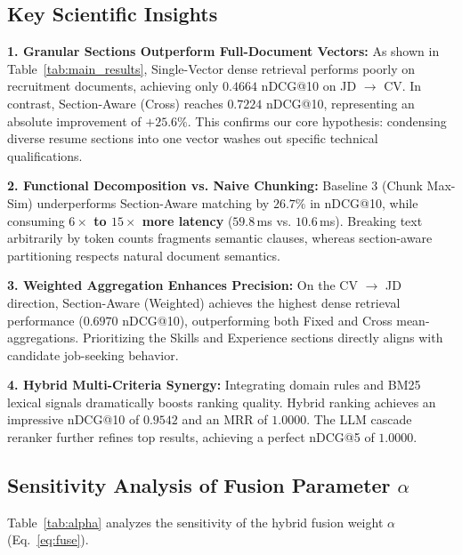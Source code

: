 \documentclass[runningheads]{llncs}
\begin{document}
\subsection{Key Scientific Insights}

\textbf{1. Granular Sections Outperform Full-Document Vectors:}
As shown in Table~\ref{tab:main_results}, Single-Vector dense retrieval performs poorly on recruitment documents, achieving only $0.4664$ nDCG@10 on JD $\rightarrow$ CV. In contrast, Section-Aware (Cross) reaches $0.7224$ nDCG@10, representing an absolute improvement of \textbf{$+25.6\%$}. This confirms our core hypothesis: condensing diverse resume sections into one vector washes out specific technical qualifications.

\textbf{2. Functional Decomposition vs. Naive Chunking:}
Baseline 3 (Chunk Max-Sim) underperforms Section-Aware matching by $26.7\%$ in nDCG@10, while consuming \textbf{$6\times$ to $15\times$ more latency} ($59.8$\,ms vs. $10.6$\,ms). Breaking text arbitrarily by token counts fragments semantic clauses, whereas section-aware partitioning respects natural document semantics.

\textbf{3. Weighted Aggregation Enhances Precision:}
On the CV $\rightarrow$ JD direction, Section-Aware (Weighted) achieves the highest dense retrieval performance ($0.6970$ nDCG@10), outperforming both Fixed and Cross mean-aggregations. Prioritizing the Skills and Experience sections directly aligns with candidate job-seeking behavior.

\textbf{4. Hybrid Multi-Criteria Synergy:}
Integrating domain rules and BM25 lexical signals dramatically boosts ranking quality. Hybrid ranking achieves an impressive nDCG@10 of \textbf{$0.9542$} and an MRR of \textbf{$1.0000$}. The LLM cascade reranker further refines top results, achieving a perfect nDCG@5 of \textbf{$1.0000$}.

\subsection{Sensitivity Analysis of Fusion Parameter $\alpha$}
Table~\ref{tab:alpha} analyzes the sensitivity of the hybrid fusion weight $\alpha$ (Eq.~\ref{eq:fuse}).
\end{document}
